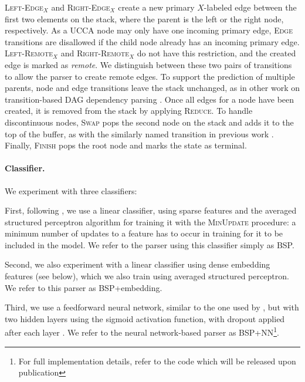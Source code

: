 \documentclass[11pt]{article}
\begin{document}
\textsc{Left-Edge$_X$} and \textsc{Right-Edge$_X$} create a new primary $X$-labeled edge between the first two elements on the stack, where the parent is the left or the right node, respectively.
As a UCCA node may only have one incoming primary edge,
\textsc{Edge} transitions are disallowed if the child node already
has an incoming primary edge.
\textsc{Left-Remote$_X$} and \textsc{Right-Remote$_X$} do not have this restriction,
and the created edge is marked as \textit{remote}.
We distinguish between these two pairs of transitions to allow the parser to create remote edges.
To support the prediction of multiple parents, node and edge transitions
leave the stack unchanged, as in other work on
transition-based DAG dependency parsing
\cite{sagae2008shift,ribeyre-villemontedelaclergerie-seddah:2014:SemEval,tokgoz2015transition}.
Once all edges for a node have been created, it is removed from the stack
by applying \textsc{Reduce}.
To handle discontinuous nodes, \textsc{Swap} pops the second
node on the stack and adds it to the top of the buffer, as with the similarly
named transition in previous work \cite{nivre2009non,maier2015discontinuous}.
Finally, \textsc{Finish} pops the root node and marks the state as terminal.

\paragraph{Classifier.}
We experiment with three classifiers:

First, following , we use a linear classifier, using
sparse features and
the averaged structured perceptron algorithm for training it
\cite{Coll:04} with the \textsc{MinUpdate} \cite{goldberg2011learning} procedure:
a minimum number of updates to a feature has to occur in training for it
to be included in the model.
We refer to the parser using this classifier simply as BSP.

Second, we also experiment with a linear classifier using dense embedding features (see below),
which we also train using averaged structured perceptron.
We refer to this parser as BSP+embedding.

Third, we use a feedforward neural network, similar to the one used by ,
but with two hidden layers using the sigmoid activation function,
with dropout applied after each layer \cite{srivastava2014dropout}.
We refer to the neural network-based parser as BSP+NN\footnote{For full implementation
details, refer to the code which will be released upon publication}.
\end{document}

